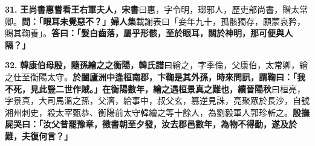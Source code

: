 \textbf{31.} \textbf{王尚書惠嘗看王右軍夫人，}{\footnotesize \textbf{宋書}曰惠，字令明，瑯邪人，歷吏部尚書，贈太常卿。}\textbf{問：「眼耳未覺惡不？」}{\footnotesize \textbf{婦人集}載謝表曰「妾年九十，孤骸獨存，願蒙哀矜，賜其鞠養」。}\textbf{答曰：「髮白齒落，屬乎形骸，至於眼耳，關於神明，那可便與人隔？」}

\textbf{32.} \textbf{韓康伯母殷，隨孫繪之之衡陽，}{\footnotesize \textbf{韓氏譜}曰繪之，字季倫，父康伯，太常卿，繪之仕至衡陽太守。}\textbf{於闔廬洲中逢桓南郡，卞鞠是其外孫，時來問訊，謂鞠曰：「我不死，見此豎二世作賊。」在衡陽數年，繪之遇桓景真之難也，}{\footnotesize \textbf{續晉陽秋}曰桓亮，字景真，大司馬溫之孫，父濟，給事中，叔父玄，篡逆見誅，亮聚眾於長沙，自號湘州刺史，殺太宰甄恭、衡陽前太守韓繪之等十餘人，為劉毅軍人郭珍斬之。}\textbf{殷撫屍哭曰：「汝父昔罷豫章，徵書朝至夕發，汝去郡邑數年，為物不得動，遂及於難，夫復何言？」}